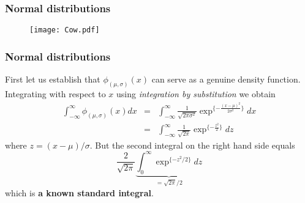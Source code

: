 \documentclass[notes=show,smaller,handout]{beamer}\usepackage[]{graphicx}\usepackage[]{color}
\newcommand{\N}{\mathcal{N}}
\begin{document}
\begin{frame}%

\frametitle{Normal distributions}

\begin{figure}[ptb]\centering
\texttt{[image: Cow.pdf]}%
\end{figure}%

\end{frame}%

\begin{frame}%

\frametitle{Normal distributions}

First let us establish that $\phi_{(\mu,\sigma)}(x)$ can serve as a
genuine density function. Integrating with respect to $x$ using
\textit{integration by substitution} we obtain
\begin{eqnarray*}
\int_{-\infty}^{\infty}\phi_{(\mu,\sigma)}(x)dx&=&
\int_{-\infty}^{\infty}\frac{1}{\sqrt{2\pi\sigma^2}}\exp^{\{-\frac{(x-\mu)^2}{2\sigma^2}\}}dx
\\
 &=&\int_{-\infty}^{\infty}\frac{1}{\sqrt{2\pi}}\exp^{\{-\frac{z^2}{2}\}}dz
\end{eqnarray*}
where $z=(x-\mu)/\sigma$. But the second integral on the right
hand side equals
$$
\frac{2}{\sqrt{2\pi}}\underbrace{\int_0^{\infty}\exp^{\{-z^2/2\}}dz}_{={\sqrt{2\pi}} \big/ {2}}
$$
which is \textbf{a known standard integral}.
%
\end{frame}%
\end{document}
